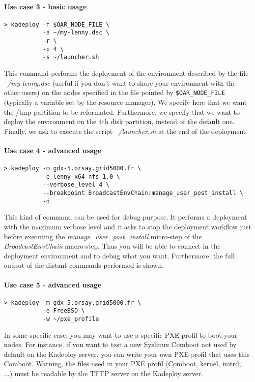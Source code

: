 \documentclass[a4wide,10pt,oneside]{book}
\begin{document}
\paragraph{Use case 3 - basic usage}
\begin{verbatim}
> kadeploy -f $OAR_NODE_FILE \
           -a ~/my-lenny.dsc \
           -r \
           -p 4 \
           -s ~/launcher.sh
\end{verbatim}
This command performs the deployment of the environment described by the file \textit{~/my-lenny.dsc} (useful if you don't want to share your environment with the other users) on the nodes specified in the file pointed by \texttt{\$OAR\_NODE\_FILE} (typically a variable set by the resource manager). We specify here that we want the /tmp partition to be reformated. Furthermore, we specify that we want to deploy the environment on the 4th disk partition, instead of the default one. Finally, we ask to execute the script \textit{~/launcher.sh} at the end of the deployment.

\paragraph{Use case 4 - advanced usage}
\begin{verbatim}
> kadeploy -m gdx-5.orsay.grid5000.fr \
           -e lenny-x64-nfs-1.0 \
           --verbose_level 4 \
           --breakpoint BroadcastEnvChain:manage_user_post_install \
           -d
\end{verbatim}
This kind of command can be used for debug purpose. It performs a deployment with the maximum verbose level and it asks to stop the deployment workflow just before executing the \textit{manage\_user\_post\_install} micro-step of the \textit{BroadcastEnvChain} macro-step. Thus you will be able to connect in the deployment environment and to debug what you want. Furthermore, the full output of the distant commands performed is shown.

\paragraph{Use case 5 - advanced usage}
\begin{verbatim}
> kadeploy -m gdx-5.orsay.grid5000.fr \
           -e FreeBSD \
           -w ~/pxe_profile
\end{verbatim}
In some specific case, you may want to use a specific PXE profil to boot your nodes. For instance, if you want to test a new Syslinux Comboot not used by default on the Kadeploy server, you can write your own PXE profil that uses this Comboot. Warning, the files used in your PXE profil (Comboot, kernel, initrd, ...) must be readable by the TFTP server on the Kadeploy server.
\end{document}
